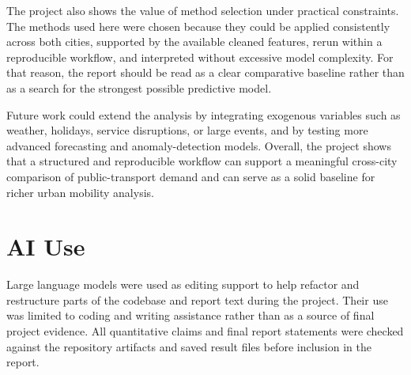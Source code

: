\documentclass[10pt,twocolumn,a4paper]{article}
\begin{document}
The project also shows the value of method selection under practical
constraints. The methods used here were chosen because they could be applied
consistently across both cities, supported by the available cleaned features,
rerun within a reproducible workflow, and interpreted without excessive model
complexity. For that reason, the report should be read as a clear comparative
baseline rather than as a search for the strongest possible predictive model.

Future work could extend the analysis by integrating exogenous variables such as
weather, holidays, service disruptions, or large events, and by testing more
advanced forecasting and anomaly-detection models. Overall, the project shows
that a structured and reproducible workflow can support a meaningful cross-city
comparison of public-transport demand and can serve as a solid baseline for
richer urban mobility analysis.


\section{AI Use}

Large language models were used as editing support to help refactor and
restructure parts of the codebase and report text during the project. Their use
was limited to coding and writing assistance rather than as a source of final
project evidence. All quantitative claims and final report statements were
checked against the repository artifacts and saved result files before
inclusion in the report.
\end{document}
